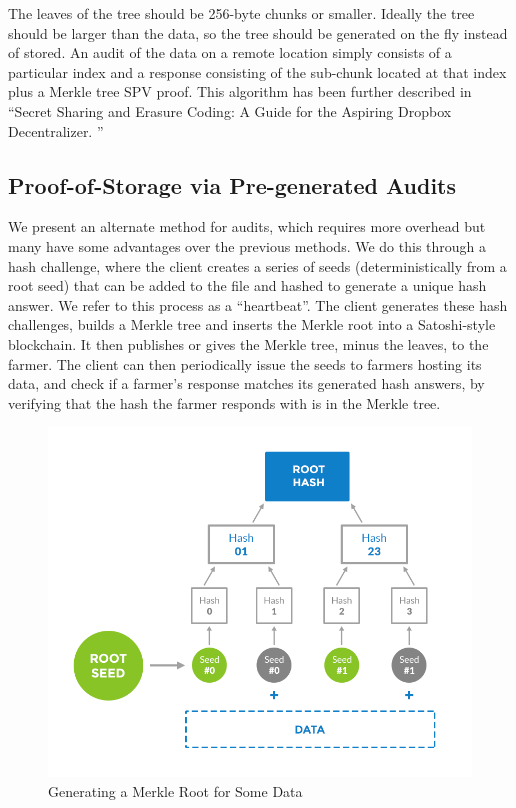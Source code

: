\documentclass[a4paper,10pt]{article}
\begin{document}
 The leaves of the tree should be 256-byte chunks or smaller. Ideally the tree should be larger than the data, so the tree should be generated on the fly instead of stored. An audit of the data on a remote location simply consists of a particular index and a response consisting of the sub-chunk located at that index plus a Merkle tree SPV proof. This algorithm has been further described in “Secret Sharing and Erasure Coding: A Guide for the Aspiring Dropbox Decentralizer. ” \cite{16} \\


\subsection{Proof-of-Storage via Pre-generated Audits}
We present an alternate method for audits, which requires more overhead but many have some advantages over the previous methods. We do this through a hash challenge, where the client creates a series of seeds (deterministically from a root seed) that can be added to the file and hashed to generate a unique hash answer. We refer to this process as a “heartbeat”. The client generates these hash challenges, builds a Merkle tree \cite{2} and inserts the Merkle root into a Satoshi-style blockchain. It then publishes or gives the Merkle tree, minus the leaves, to the farmer. The client can then periodically issue the seeds to farmers hosting its data, and check if a farmer’s response matches its generated hash answers, by verifying that the hash the farmer responds with is in the Merkle tree. \\

\begin{figure}[h!]
\centering
\includegraphics[width=\linewidth]{3}
\caption{Generating a Merkle Root for Some Data}
\end{figure}
\end{document}
